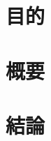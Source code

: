 \documentclass[dvipdfmx]{jsarticle}
\begin{document}
\title{}
\author{}
\date{}         %
\maketitle


\section{目的}


\section{概要}




\section{結論}


\begin{thebibliography}{9}
\end{thebibliography}
\end{document}
